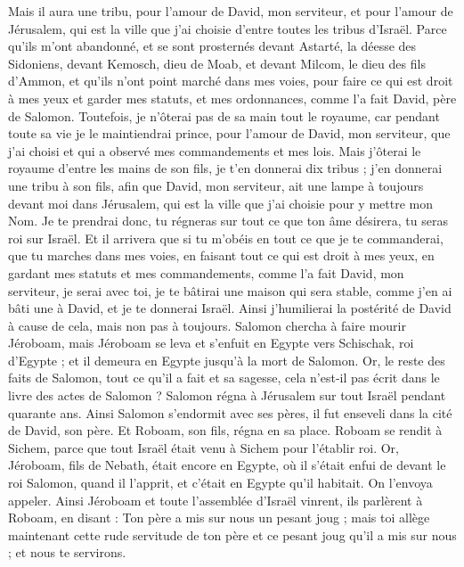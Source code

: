 \begin{multicols}{2}
Mais il aura une tribu, pour l'amour de David, mon serviteur, et pour l'amour de Jérusalem, qui est la ville que j'ai choisie d'entre toutes les tribus d'Israël.
Parce qu'ils m'ont abandonné, et se sont prosternés devant Astarté, la déesse des Sidoniens, devant Kemosch, dieu de Moab, et devant Milcom, le dieu des fils d’Ammon, et qu'ils n'ont point marché dans mes voies, pour faire ce qui est droit à mes yeux et garder mes statuts, et mes ordonnances, comme l’a fait David, père de Salomon.
Toutefois, je n'ôterai pas de sa main tout le royaume, car pendant toute sa vie je le maintiendrai prince, pour l'amour de David, mon serviteur, que j'ai choisi et qui a observé mes commandements et mes lois.
Mais j'ôterai le royaume d'entre les mains de son fils, je t'en donnerai dix tribus ;
j'en donnerai une tribu à son fils, afin que David, mon serviteur, ait une lampe à toujours devant moi dans Jérusalem, qui est la ville que j'ai choisie pour y mettre mon Nom.
Je te prendrai donc, tu régneras sur tout ce que ton âme désirera, tu seras roi sur Israël.
Et il arrivera que si tu m'obéis en tout ce que je te commanderai, que tu marches dans mes voies, en faisant tout ce qui est droit à mes yeux, en gardant mes statuts et mes commandements, comme l’a fait David, mon serviteur, je serai avec toi, je te bâtirai une maison qui sera stable, comme j'en ai bâti une à David, et je te donnerai Israël.
Ainsi j’humilierai la postérité de David à cause de cela, mais non pas à toujours.
Salomon chercha à faire mourir Jéroboam, mais Jéroboam se leva et s'enfuit en Egypte vers Schischak, roi d'Egypte ; et il demeura en Egypte jusqu'à la mort de Salomon.
Or, le reste des faits de Salomon, tout ce qu'il a fait et sa sagesse, cela n'est-il pas écrit dans le livre des actes de Salomon ?
Salomon régna à Jérusalem sur tout Israël pendant quarante ans.
Ainsi Salomon s'endormit avec ses pères, il fut enseveli dans la cité de David, son père. Et Roboam, son fils, régna en sa place.
\VerseOne{}Roboam se rendit à Sichem, parce que tout Israël était venu à Sichem pour l'établir roi.
Or, Jéroboam, fils de Nebath, était encore en Egypte, où il s'était enfui de devant le roi Salomon, quand il l'apprit, et c’était en Egypte qu’il habitait.
On l'envoya appeler. Ainsi Jéroboam et toute l'assemblée d'Israël vinrent, ils parlèrent à Roboam, en disant :
Ton père a mis sur nous un pesant joug ; mais toi allège maintenant cette rude servitude de ton père et ce pesant joug qu'il a mis sur nous ; et nous te servirons.

\end{multicols}

